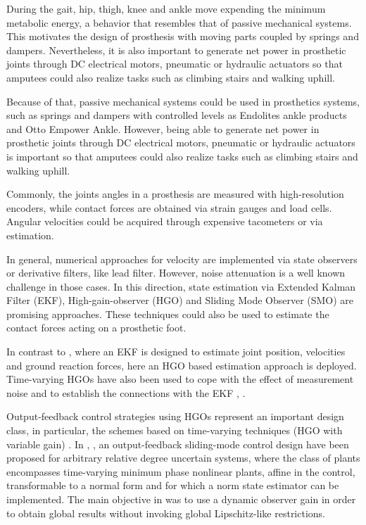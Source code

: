 \documentclass[letterpaper, 10 pt, conference]{ieeeconf}  %
\theoremstyle{plain}
\theoremstyle{definition}
\theoremstyle{remark}
\begin{document}
During the gait, hip, thigh, knee and ankle move expending the minimum metabolic energy, a behavior that resembles that of passive mechanical systems. This motivates the design of prosthesis with moving parts coupled by springs and dampers. Nevertheless, it is also important to generate net power in prosthetic joints through DC electrical motors, pneumatic or hydraulic actuators \cite{Goldfarb2008} \cite{Bedard2002} so that amputees could also realize tasks such as climbing stairs and walking uphill.

Because of that, passive mechanical systems could be used in prosthetics systems, such as springs and dampers with controlled levels as Endolites ankle products and Otto Empower Ankle. However, being able to generate net power in prosthetic joints through DC electrical motors, pneumatic or hydraulic actuators \cite{Goldfarb2008} \cite{Bedard2002} is important so that amputees could also realize tasks such as climbing stairs and walking uphill.

Commonly, the joints angles in a prosthesis are measured with high-resolution encoders, while contact forces are obtained via strain gauges and load cells. Angular velocities could be acquired through expensive tacometers or via estimation. 

In general, numerical approaches for velocity are implemented via state observers or derivative filters, like lead filter. However,  noise attenuation  is a well known challenge in those cases. In this direction, state estimation via Extended Kalman Filter (EKF), High-gain-observer (HGO) and Sliding Mode Observer (SMO) are promising approaches. These techniques could also be used to estimate the contact forces acting on a prosthetic foot.

In contrast to \cite{Fakoorian2016}, where an EKF is designed to estimate joint position, velocities and ground reaction forces, here an HGO based estimation approach is deployed. Time-varying HGOs have also been used to cope with the effect of measurement noise and to establish the connections with the EKF \cite{AK:07}, \cite{Khalil2009}. 

Output-feedback control strategies using HGOs \cite{OK:97} represent an important design class, in particular, the schemes based on time-varying techniques (HGO with variable gain) \cite{P:01}\cite{KKJ:02} \cite{KKC:03}\cite{LL:05}\cite{AK:07}. In \cite{POH:2011}, \cite{PHCL:2007}, an output-feedback sliding-mode control design have been proposed for arbitrary relative degree uncertain systems, where the class of plants encompasses time-varying minimum phase nonlinear plants, affine in the control, transformable to a normal form and for which a norm state estimator can be implemented. The main objective in \cite{POH:2011} was to use a dynamic observer gain in order to obtain global results without invoking global Lipschitz-like restrictions. 
\end{document}
